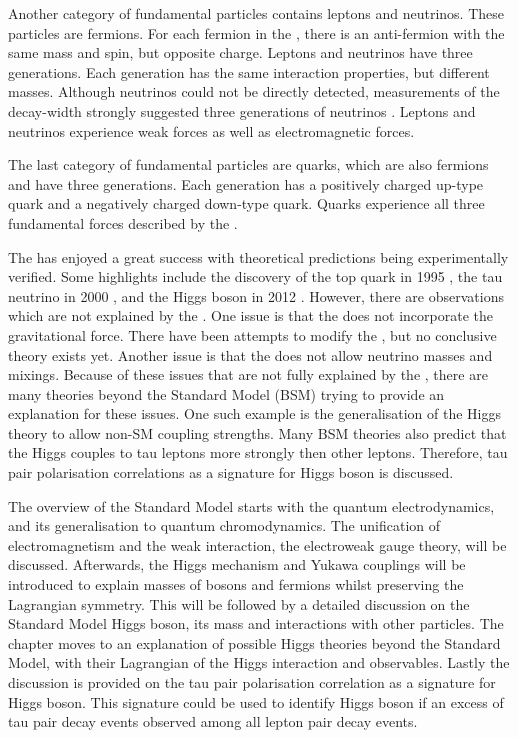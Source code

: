 Another category of fundamental particles contains leptons and neutrinos. These particles are fermions. For each fermion in the \SM, there is an anti-fermion with the same mass and spin, but opposite charge. Leptons and neutrinos have three generations. Each generation has the same interaction properties, but different masses. Although neutrinos could not be directly detected, measurements of the \PZ decay-width strongly suggested three generations of neutrinos \cite{ALEPH:2005ab}. Leptons and neutrinos experience weak forces as well as electromagnetic forces.

The last category of fundamental particles are quarks, which are also fermions and have three generations. Each generation has a positively charged up-type quark and a negatively charged down-type quark. Quarks experience all three fundamental forces described by the \SM.

The \SM has enjoyed a great success with theoretical predictions being experimentally verified. Some highlights include the discovery of the top quark in 1995 \cite{Abachi:1995iq}, the tau neutrino in 2000 \cite{Kodama:2000mp}, and the Higgs boson in 2012 \cite{Aad:2012tfa,Chatrchyan:2012ufa}. However, there are observations which are not explained by the \SM. One issue is that the \SM does not incorporate the gravitational force. There have been attempts to modify the \SM, but no conclusive theory exists yet. Another issue is that the \SM does not allow neutrino masses and mixings. Because of these issues that are not fully explained by the \SM, there are many theories beyond the Standard Model (BSM) trying to provide an explanation for these issues. One such example is the generalisation of the Higgs theory to allow non-SM coupling strengths. Many BSM theories also predict that the Higgs couples to tau leptons more strongly then other leptons. Therefore, tau pair polarisation correlations as a signature for Higgs boson is discussed.

The overview of the Standard Model starts with the quantum electrodynamics, and its generalisation to quantum chromodynamics. The unification of electromagnetism and the weak interaction, the electroweak gauge theory, will be discussed. Afterwards, the Higgs mechanism and Yukawa couplings will be introduced to explain masses of bosons and fermions whilst preserving the Lagrangian symmetry. This will be followed by a detailed discussion on the Standard Model Higgs boson, its mass and interactions with other particles. The chapter moves to an explanation of possible Higgs theories beyond the Standard Model, with their  Lagrangian of the Higgs interaction and observables. Lastly the discussion is provided on  the tau pair polarisation correlation as a signature for Higgs boson. This signature could be used to identify Higgs boson if an excess of tau pair decay events observed among all lepton pair decay events.


